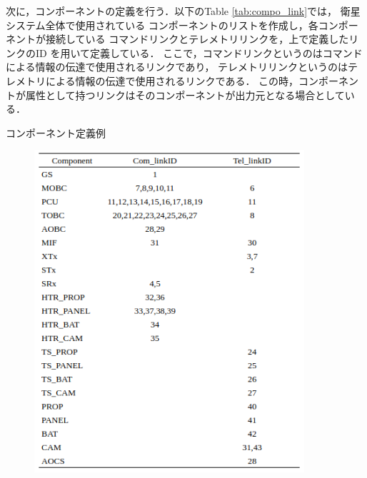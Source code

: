 \documentclass[11pt]{article}
\begin{document}
次に，コンポーネントの定義を行う．以下のTable \ref{tab:compo_link}では，
衛星システム全体で使用されている
コンポーネントのリストを作成し，各コンポーネントが接続している
コマンドリンクとテレメトリリンクを，上で定義したリンクのID
を用いて定義している．
ここで，コマンドリンクというのはコマンドによる情報の伝達で使用されるリンクであり，
テレメトリリンクというのはテレメトリによる情報の伝達で使用されるリンクである．
この時，コンポーネントが属性として持つリンクはそのコンポーネントが出力元となる場合としている．

\newpage
\begin{table}[H]
   \centering
   \caption{コンポーネント定義例}
   \label{tab:compo_link}
\end{table}
\vspace{-2zh}
\begin{figure}[H]
   \centering
      \includegraphics[width=10cm]{figure/compo_link.png}
\end{figure}
\end{document}
